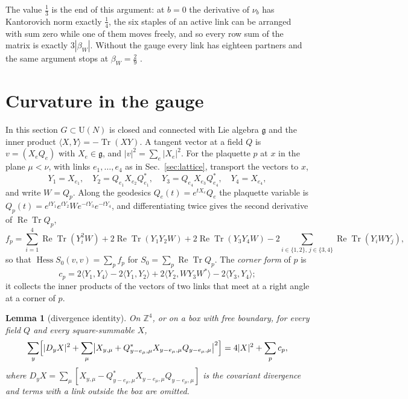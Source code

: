 \documentclass[11pt]{amsart}
\newtheorem{lemma}[theorem]{Lemma}
\theoremstyle{definition}
\theoremstyle{remark}
\numberwithin{equation}{section}
\newcommand{\Z}{\mathbb{Z}}
\newcommand{\U}{\mathrm{U}}
\newcommand{\g}{\mathfrak{g}}
\newcommand{\Tr}{\operatorname{Tr}}
\newcommand{\ReTr}{\operatorname{Re}\operatorname{Tr}}
\newcommand{\Hess}{\operatorname{Hess}}
\newcommand{\ip}[2]{\langle #1,#2\rangle}
\begin{document}
The value $\frac13$ is the end of this argument: at $b=0$ the derivative of
$\nu_b$ has Kantorovich norm exactly $\frac14$, the six staples of an active
link can be arranged with sum zero while one of them moves freely, and so
every row sum of the matrix is exactly $3|\beta_W|$. Without the gauge every
link has eighteen partners and the same argument stops at $\beta_W=\frac29$
\cite[Prop.~13]{BB26a}.

\section{Curvature in the gauge}\label{sec:curvature}

In this section $G\subset\U(N)$ is closed and connected with Lie algebra $\g$
and the inner product $\ip XY=-\Tr(XY)$. A tangent vector at a field $Q$ is
$v=(X_eQ_e)$ with $X_e\in\g$, and $|v|^2=\sum_e|X_e|^2$. For the plaquette $p$
at $x$ in the plane $\mu<\nu$, with links $e_1,\dots,e_4$ as in
Sec.~\ref{sec:lattice}, transport the vectors to $x$,
\[
Y_1=X_{e_1},\quad Y_2=Q_{e_1}X_{e_2}Q_{e_1}^*,\quad
Y_3=Q_{e_4}X_{e_3}Q_{e_4}^*,\quad Y_4=X_{e_4},
\]
and write $W=Q_p$. Along the geodesics $Q_e(t)=e^{tX_e}Q_e$ the plaquette
variable is $Q_p(t)=e^{tY_1}e^{tY_2}We^{-tY_3}e^{-tY_4}$, and differentiating
twice gives the second derivative of $\ReTr Q_p$,
\begin{equation}\label{eq:fp}
f_p=\sum_{i=1}^4\ReTr(Y_i^2W)+2\ReTr(Y_1Y_2W)+2\ReTr(Y_3Y_4W)
-2\!\!\sum_{i\in\{1,2\},\,j\in\{3,4\}}\!\!\ReTr(Y_iWY_j),
\end{equation}
so that $\Hess S_0(v,v)=\sum_pf_p$ for $S_0=\sum_p\ReTr Q_p$. The
\emph{corner form} of $p$ is
\begin{equation}\label{eq:corner}
c_p=2\ip{Y_1}{Y_4}-2\ip{Y_1}{Y_2}+2\ip{Y_2}{WY_3W^*}-2\ip{Y_3}{Y_4};
\end{equation}
it collects the inner products of the vectors of two links that meet at a
right angle at a corner of $p$.

\begin{lemma}[divergence identity]\label{lem:identity}
On $\Z^4$, or on a box with free boundary, for every field $Q$ and every
square-summable $X$,
\[
\sum_y\Bigl[|D_yX|^2+\sum_\mu\bigl|X_{y,\mu}+Q^*_{y-e_\mu,\mu}X_{y-e_\mu,\mu}
Q_{y-e_\mu,\mu}\bigr|^2\Bigr]=4|X|^2+\sum_pc_p ,
\]
where $D_yX=\sum_\mu[X_{y,\mu}-Q^*_{y-e_\mu,\mu}X_{y-e_\mu,\mu}Q_{y-e_\mu,\mu}]$
is the covariant divergence and terms with a link outside the box are
omitted.
\end{lemma}
\end{document}
